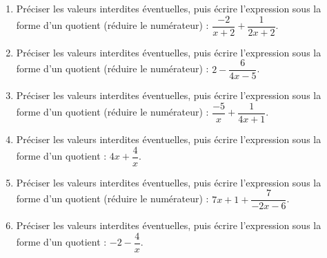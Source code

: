 {%
\begin{Exercice}%
\leavevmode\vspace{-\baselineskip}
\begin{enumerate}[itemsep=1em]
	\item \begin{minipage}[t]{\linewidth}Préciser les valeurs interdites éventuelles, puis écrire l'expression sous la forme d'un quotient (réduire le numérateur) : $\dfrac{-2}{x+2}+\dfrac{1}{2x+2}$.\end{minipage}
	\item \begin{minipage}[t]{\linewidth}Préciser les valeurs interdites éventuelles, puis écrire l'expression sous la forme d'un quotient (réduire le numérateur) : $2-\dfrac{6}{4x-5}$.\end{minipage}
	\item \begin{minipage}[t]{\linewidth}Préciser les valeurs interdites éventuelles, puis écrire l'expression sous la forme d'un quotient (réduire le numérateur) : $\dfrac{-5}{x}+\dfrac{1}{4x+1}$.\end{minipage}
	\item \begin{minipage}[t]{\linewidth}Préciser les valeurs interdites éventuelles, puis écrire l'expression sous la forme d'un quotient : $4x+\dfrac{4}{x}$.\end{minipage}
	\item \begin{minipage}[t]{\linewidth}Préciser les valeurs interdites éventuelles, puis écrire l'expression sous la forme d'un quotient (réduire le numérateur) : $7x+1+\dfrac{7}{-2x-6}$.\end{minipage}
	\item \begin{minipage}[t]{\linewidth}Préciser les valeurs interdites éventuelles, puis écrire l'expression sous la forme d'un quotient : $-2-\dfrac{4}{x}$.\end{minipage}
\end{enumerate}
\end{Exercice}

}
